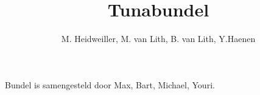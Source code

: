 \documentclass[11pt,a4paper,twoside]{article}
\title{Tunabundel}
\author{M. Heidweiller, M. van Lith, B. van Lith, Y.Haenen}
\begin{document}
\noindent




\renewcommand\contentsname{List of awesomeness.}
\tableofcontents
{}
\vfill
Bundel is samengesteld door Max, Bart, Michael, Youri.
\clearpage

\raggedright
\clearpage
\clearpage
\clearpage
\clearpage
\clearpage
\clearpage
\clearpage
\clearpage
\clearpage
\clearpage
\clearpage
\clearpage
\clearpage
\clearpage
\clearpage
\clearpage
\clearpage

\end{document}
